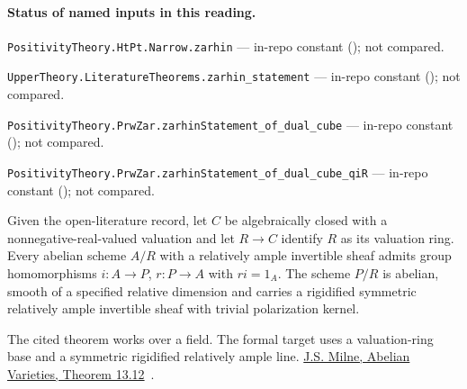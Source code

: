 

\paragraph{Status of named inputs in this reading.}
\noindent\nolinkurl{PositivityTheory.HtPt.Narrow.zarhin} --- in-repo constant (); not compared.\par
\noindent\nolinkurl{UpperTheory.LiteratureTheorems.zarhin_statement} --- in-repo constant (); not compared.\par
\noindent\nolinkurl{PositivityTheory.PrwZar.zarhinStatement_of_dual_cube} --- in-repo constant (); not compared.\par
\noindent\nolinkurl{PositivityTheory.PrwZar.zarhinStatement_of_dual_cube_qiR} --- in-repo constant (); not compared.\par

\begin{formalstatement}\label{sub:T22}

Given the open-literature record, let $C$ be algebraically closed with a
nonnegative-real-valued valuation and let $R\to C$ identify $R$ as its
valuation ring. Every abelian scheme $A/R$ with a relatively ample
invertible sheaf admits group homomorphisms $i:A\to P$, $r:P\to A$
with $r i=1_A$. The scheme $P/R$ is abelian, smooth of a specified
relative dimension and carries a rigidified symmetric relatively ample
invertible sheaf with trivial polarization kernel.

\end{formalstatement}

\noindent The cited theorem works over a field. The formal target uses a valuation-ring base and a symmetric rigidified relatively ample line. \href{https://www.jmilne.org/math/CourseNotes/AVc.pdf}{J.S. Milne, Abelian Varieties, Theorem 13.12}~\cite{r21-milne-av}.
